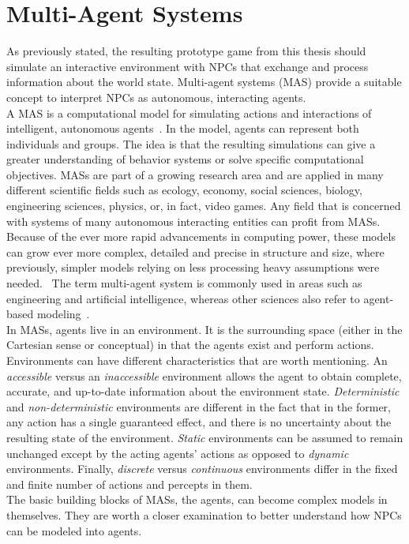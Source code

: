 \section{Multi-Agent Systems}
As previously stated, the resulting prototype game from this thesis should simulate an interactive environment with NPCs that exchange and process information about the world state. Multi-agent systems (MAS) provide a suitable concept to interpret NPCs as autonomous, interacting agents.\\
A MAS is a computational model for simulating actions and interactions of intelligent, autonomous agents~\cite{Wooldridge2009}. In the model, agents can represent both individuals and groups. The idea is that the resulting simulations can give a greater understanding of behavior systems or solve specific computational objectives. MASs are part of a growing research area and are applied in many different scientific fields such as ecology, economy, social sciences, biology, engineering sciences, physics, or, in fact, video games. Any field that is concerned with systems of many autonomous interacting entities can profit from MASs. Because of the ever more rapid advancements in computing power, these models can grow ever more complex, detailed and precise in structure and size, where previously, simpler models relying on less processing heavy assumptions were needed.~\cite{Helbing2012} The term multi-agent system is commonly used in areas such as engineering  and artificial intelligence, whereas other sciences also refer to agent-based modeling~\cite{Niazi2011}.\\
In MASs, agents live in an environment. It is the surrounding space (either in the Cartesian sense or conceptual) in that the agents exist and perform actions. Environments can have different characteristics that are worth mentioning. An \textit{accessible} versus an \textit{inaccessible} environment allows the agent to obtain complete, accurate, and up-to-date information about the environment state. \textit{Deterministic} and \textit{non-deterministic} environments are different in the fact that in the former, any action has a single guaranteed effect, and there is no uncertainty about the resulting state of the environment. \textit{Static} environments can be assumed to remain unchanged except by the acting agents' actions as opposed to \textit{dynamic} environments. Finally, \textit{discrete} versus \textit{continuous} environments differ in the fixed and finite number of actions and percepts in them.~\cite{Wooldridge2009}\\
The basic building blocks of MASs, the agents, can become complex models in themselves. They are worth a closer examination to better understand how NPCs can be modeled into agents.
